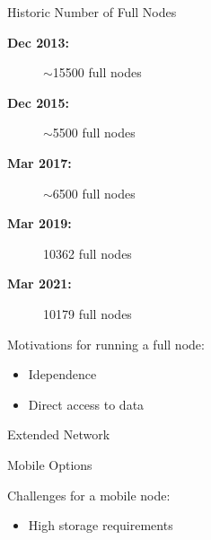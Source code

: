 \documentclass[handout]{beamer}
\begin{document}
\begin{frame}{Historic Number of Full Nodes}
	\begin{description}
		\item[\textbf{Dec 2013:}] $\sim$15500 full nodes
		\item[\textbf{Dec 2015:}] $\sim$5500 full nodes
		\item[\textbf{Mar 2017:}] $\sim$6500 full nodes
		\item[\textbf{Mar 2019:}] 10362 full nodes
		\item[\textbf{Mar 2021:}] 10179 full nodes
	\end{description}	
		
	\vspace{1 cm}
	
	Motivations for running a full node:
	\begin{itemize}
		\item Idependence
		\item Direct access to data
	\end{itemize}
	
\end{frame}

%		


\begin{frame}{Extended Network}
	\centering
	\begin{tikzpicture}[scale=1, every node/.style={scale=1}]
		
	\end{tikzpicture}
\end{frame}

\begin{frame}{Mobile Options}

Challenges for a mobile node:

\begin{itemize}
	\item High storage requirements
\end{itemize}



\end{frame}
\end{document}
